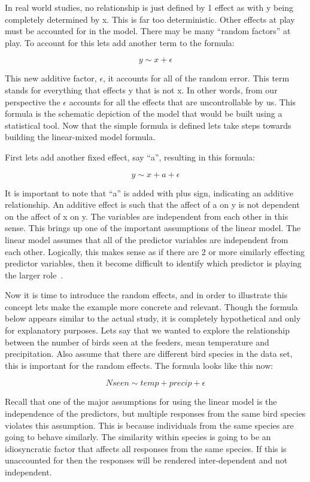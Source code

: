 In real world studies, no relationship is just defined by 1 effect as with y being completely determined by x. This is far too deterministic. Other effects at play must be accounted for in the model. There may be many ``random factors'' at play. To account for this lets add another term to the formula:

\[ y \sim x + \epsilon\]

This new additive factor, $\epsilon$, it accounts for all of the random error. This term stands for everything that effects y that is not x. In other words, from our perspective the $\epsilon$ accounts for all the effects that are uncontrollable by us. This formula is the schematic depiction of the model that would be built using a statistical tool. Now that the simple formula is defined lets take steps towards building the linear-mixed model formula.

First lets add another fixed effect, say ``a'', resulting in this formula:

\[ y \sim x + a + \epsilon\]

It is important to note that ``a'' is added with plus sign, indicating an additive relationship. An additive effect is such that the affect of a on y is not dependent on the affect of x on y. The variables are independent from each other in this sense. This brings up one of the important assumptions of the linear model. The linear model assumes that all of the predictor variables are independent from each other. Logically, this makes sense as if there are 2 or more similarly effecting predictor variables, then it become difficult to identify which predictor is playing the larger role~\cite{RMixedEffect:online}.

Now it is time to introduce the random effects, and in order to illustrate this concept lets make the example more concrete and relevant. Though the formula below appears similar to the actual study, it is completely hypothetical and only for explanatory purposes. Lets say that we wanted to explore the relationship between the number of birds seen at the feeders, mean temperature and precipitation. Also assume that there are different bird species in the data set, this is important for the random effects. The formula looks like this now:

\[ Nseen \sim temp + precip + \epsilon\]

Recall that one of the major assumptions for using the linear model is the independence of the predictors, but multiple responses from the same bird species violates this assumption. This is because individuals from the same species are going to behave similarly. The similarity within species is going to be an idiosyncratic factor that affects all responses from the same species. If this is unaccounted for then the responses will be rendered inter-dependent and not independent. 

